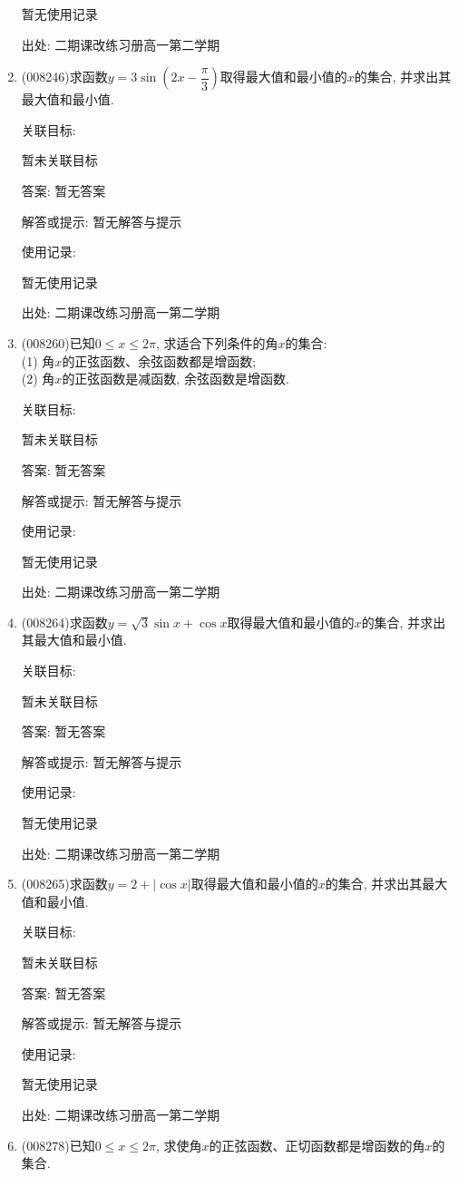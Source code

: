 \documentclass[10pt,a4paper]{article}
\begin{document}
\begin{enumerate}[1.]
暂无使用记录


出处: 二期课改练习册高一第二学期
\item { (008246)}求函数$y=3\sin (2x-\dfrac{\pi}3)$取得最大值和最小值的$x$的集合, 并求出其最大值和最小值.


关联目标:

暂未关联目标

答案: 暂无答案

解答或提示: 暂无解答与提示

使用记录:

暂无使用记录


出处: 二期课改练习册高一第二学期
\item { (008260)}已知$0\le x\le 2\pi$, 求适合下列条件的角$x$的集合:\\
(1) 角$x$的正弦函数、余弦函数都是增函数;\\
(2) 角$x$的正弦函数是减函数, 余弦函数是增函数.


关联目标:

暂未关联目标

答案: 暂无答案

解答或提示: 暂无解答与提示

使用记录:

暂无使用记录


出处: 二期课改练习册高一第二学期
\item { (008264)}求函数$y=\sqrt 3\sin x+\cos x$取得最大值和最小值的$x$的集合, 并求出其最大值和最小值.


关联目标:

暂未关联目标

答案: 暂无答案

解答或提示: 暂无解答与提示

使用记录:

暂无使用记录


出处: 二期课改练习册高一第二学期
\item { (008265)}求函数$y=2+|\cos x|$取得最大值和最小值的$x$的集合, 并求出其最大值和最小值.


关联目标:

暂未关联目标

答案: 暂无答案

解答或提示: 暂无解答与提示

使用记录:

暂无使用记录


出处: 二期课改练习册高一第二学期
\item { (008278)}已知$0\le x\le 2\pi$, 求使角$x$的正弦函数、正切函数都是增函数的角$x$的集合.



\end{enumerate}
\end{document}
